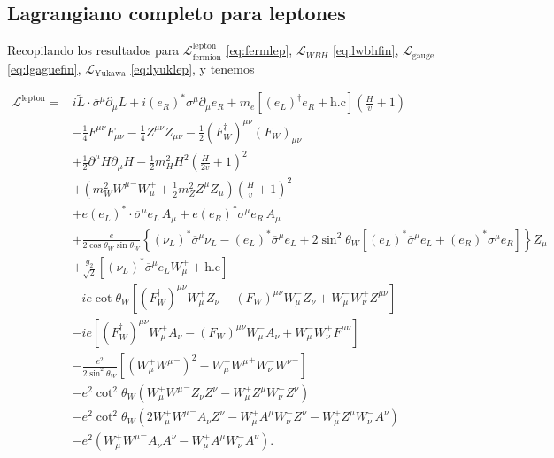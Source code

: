 \subsection{Lagrangiano completo para leptones}
Recopilando los resultados para 
$\mathcal{L}_{\text{fermion}}^{\text{lepton}}$ \eqref{eq:fermlep}, $\mathcal{L}_{WBH}$
\eqref{eq:lwbhfin}, $\mathcal{L}_{\text{gauge}}$ \eqref{eq:lgaguefin}, $\mathcal{L}_{\text{Yukawa}}$ \eqref{eq:lyuklep}, y
 tenemos
\begin{frame}
\begin{align}
\label{eq:lsmwl}
   \mathcal{L}^{\text{lepton}}=&
  i \widetilde{L}\cdot\overline{\sigma}^\mu\partial_\mu L
  +i \left( e_R \right)^{*} {\sigma}^\mu\partial_\mu e_R 
+m_e \left[ \left( e_L \right)^{\dagger} e_R+\text{h.c} \right]\left( \frac{H}{v}+1\right)
\nonumber\\
&-\tfrac{1}{4}F^{\mu\nu} F_{\mu\nu}-\tfrac{1}{4}Z^{\mu\nu} Z_{\mu\nu}-\tfrac{1}{2}(F_W^\dagger)^{\mu\nu} (F_W)_{\mu\nu}
\nonumber\\
&+\tfrac{1}{2}\partial^\mu H\partial_\mu H
-\frac{1}{2}m_H^2H^2\left(\frac{H}{2v}+1\right)^2\nonumber\\
&+\left(m_W^2{W^\mu}^-W_\mu^++\frac{1}{2}m_Z^2Z^\mu Z_\mu\right)\left(\frac{H}{v}+1\right)^2\nonumber\\
 &+e \left( e_L \right)^{*}\cdot\overline{\sigma}^\mu e_L\, A_\mu
+e \left( e_R \right)^{*}{\sigma}^\mu e_R\, A_\mu \nonumber\\
&+\frac{e}{2\cos\theta_W \sin\theta_W}
\left\{
 \left( \nu_L \right)^{*}\overline{\sigma}^{\mu}\nu_L
-\left( e_L \right)^{*}\overline{\sigma}^{\mu}e_L
+2\sin^2\theta_W \left[\left( e_L \right)^{*}\overline{\sigma}^{\mu}e_L
+\left( e_R \right)^{*}{\sigma}^{\mu}e_R\right]
\right\} Z_\mu \nonumber\\
&+\frac{g_2}{\sqrt{2}}\left[(\nu_L)^* \overline{\sigma}^\mu e_LW_\mu^++\text{h.c}\right] \nonumber\\
&-ie\cot\theta_W\left[(F_W^\dagger)^{\mu\nu}W_\mu^+ Z_\nu-(F_W)^{\mu\nu}W_\mu^- Z_\nu+W_\mu^-W_\nu^+Z^{\mu\nu}\right]\nonumber\\
&-ie\left[(F_W^\dagger)^{\mu\nu}W_\mu^+ A_\nu-(F_W)^{\mu\nu}W_\mu^- A_\nu+W_\mu^-W_\nu^+F^{\mu\nu}\right]\nonumber\\
&-\frac{e^2}{2\sin^2\theta_W}\left[\left(W_\mu^+{W^\mu}^-\right)^2-W_\mu^+{W^\mu}^+W_\nu^-{W^\nu}^-\right]\nonumber\\
&-e^2\cot^2\theta_W\left(W_\mu^+{W^\mu}^-Z_\nu Z^\nu-W_\mu^+Z^\mu W_\nu^-Z^\nu\right)\nonumber\\
&-e^2\cot^2\theta_W\left(2W_\mu^+{W^\mu}^-A_\nu Z^\nu-W_\mu^+A^\mu W_\nu^-Z^\nu-W_\mu^+Z^\mu W_\nu^-A^\nu\right)\nonumber\\
&-e^2\left(W_\mu^+{W^\mu}^-A_\nu A^\nu-W_\mu^+A^\mu W_\nu^-A^\nu\right).
\end{align}
\end{frame}

